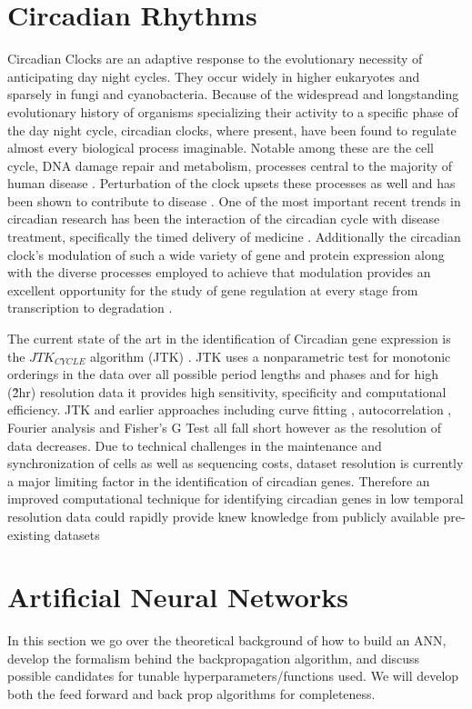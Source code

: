 \documentclass[prl,amsmath,amssymb,floatfix,superscriptaddress,notitlepage,twocolumn]{revtex4}
\begin{document}
\section{Circadian Rhythms}
Circadian Clocks are an adaptive response to the evolutionary necessity of anticipating day night cycles.  They occur widely in higher eukaryotes and sparsely in fungi and cyanobacteria.  Because of the widespread and longstanding evolutionary history of organisms specializing their activity to a specific phase of the day night cycle, circadian clocks, where present, have been found to regulate almost every biological process imaginable.  Notable among these are the cell cycle, DNA damage repair and metabolism, processes central to the majority of human disease \cite{Dunlap99}.  Perturbation of the clock upsets these processes as well and has been shown to contribute to disease \cite{Bass10}.  One of the most important recent trends in circadian research has been the interaction of the circadian cycle with disease treatment, specifically the timed delivery of medicine \cite{Zhang14}.  Additionally the circadian clock's modulation of such a wide variety of gene and protein expression along with the diverse processes employed to achieve that modulation provides an excellent opportunity for the study of gene regulation at every stage from transcription to degradation \cite{Mehra09,Menet14}.

The current state of the art in the identification of Circadian gene expression is the $JTK_{CYCLE}$ algorithm (JTK) \cite{Hughes10}.  JTK uses a nonparametric test for monotonic orderings in the data over all possible period lengths and phases and for high (\~2hr) resolution data it provides high sensitivity, specificity and computational efficiency.  JTK and earlier approaches including curve fitting \cite{Straume04}, autocorrelation \cite{Levine02}, Fourier analysis \cite{Wichert04,Whitfield04} and Fisher's G Test \cite{Wichert04} all fall short however as the resolution of data decreases.  Due to technical challenges in the maintenance and synchronization of cells as well as sequencing costs, dataset resolution is currently a major limiting factor in the identification of circadian genes.  Therefore an improved computational technique for identifying circadian genes in low temporal resolution data could rapidly provide knew knowledge from publicly available pre-existing datasets

\section{Artificial Neural Networks}
In this section we go over the theoretical background of how to build an ANN, develop the formalism behind the backpropagation algorithm, and discuss possible candidates for tunable hyperparameters/functions used. We will develop both the feed forward and back prop algorithms for completeness. 
\end{document}
